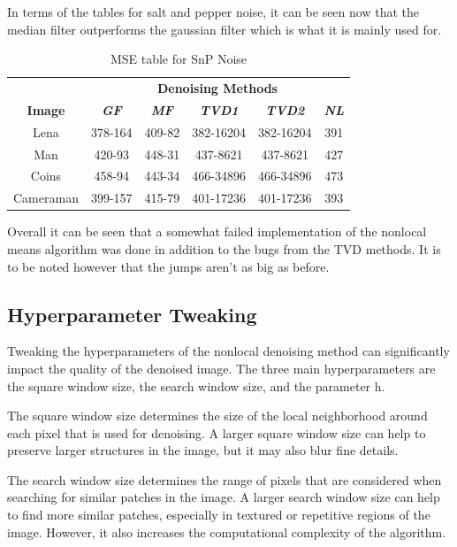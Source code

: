\documentclass[conference]{IEEEtran}
\begin{document}
    In terms of the tables for salt and pepper noise, it can be seen now that the median filter outperforms the gaussian filter which is what it is mainly used for. 

    \begin{table}[htbp]
        \caption{MSE table for SnP Noise}
        \begin{center}
        \begin{tabular}{|c|c|c|c|c|c|}
        \hline
        \textbf{}&\multicolumn{5}{|c|}{\textbf{Denoising Methods}} \\
        \cline{2-6} 
        \textbf{Image} & \textbf{\textit{GF}}& \textbf{\textit{MF}}& \textbf{\textit{TVD1}} & \textbf{\textit{TVD2}} & \textbf{\textit{NL}} \\
        \hline
        Lena &378-164&409-82&382-16204&382-16204 &391  \\
        \hline
        Man &420-93&448-31&437-8621&437-8621 &427  \\
        \hline
        Coins &458-94&443-34&466-34896&466-34896 &473  \\
        \hline
        Cameraman&399-157&415-79&401-17236&401-17236 &393  \\
        \hline
        \end{tabular}
        \label{tab1}
        \end{center}
    \end{table}

    Overall it can be seen that a somewhat failed implementation of the nonlocal means algorithm was done in addition to the bugs from the TVD methods.
    It is to be noted however that the jumps aren't as big as before.


        
\subsection{Hyperparameter Tweaking}
Tweaking the hyperparameters of the nonlocal denoising method can significantly impact the quality of the denoised image. The three main hyperparameters are the square window size, the search window size, and the parameter h.

The square window size determines the size of the local neighborhood around each pixel that is used for denoising. A larger square window size can help to preserve larger structures in the image, but it may also blur fine details.

The search window size determines the range of pixels that are considered when searching for similar patches in the image. A larger search window size can help to find more similar patches, especially in textured or repetitive regions of the image. However, it also increases the computational complexity of the algorithm.
\end{document}
